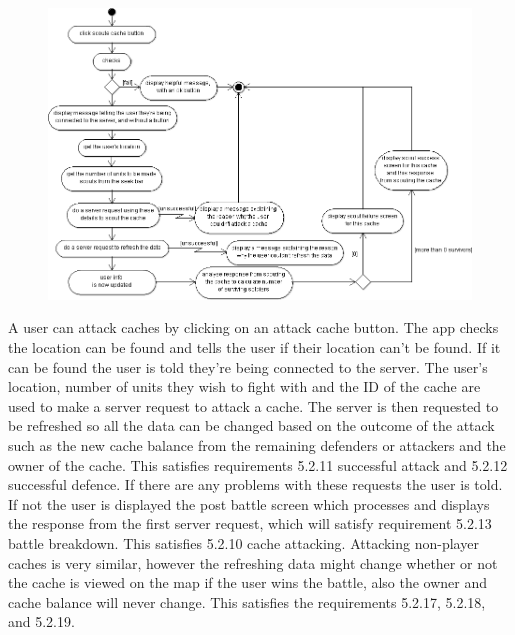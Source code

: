 \newpage
\begin{figure}
    \centering
    \includegraphics[width=\textwidth]{images/activity/scout-cache}
\end{figure}

A user can attack caches by clicking on an attack cache button. The app checks the location can be found and tells the user if their location can't be found. If it can be found the user is told they're being connected to the server. The user's location, number of units they wish to fight with and the ID of the cache are used to make a server request to attack a cache. The server is then requested to be refreshed so all the data can be changed based on the outcome of the attack such as the new cache balance from the remaining defenders or attackers and the owner of the cache. This satisfies requirements 5.2.11 successful attack and 5.2.12 successful defence. If there are any problems with these requests the user is told. If not the user is displayed the post battle screen which processes and displays the response from the first server request, which will satisfy requirement 5.2.13 battle breakdown. This satisfies 5.2.10 cache attacking. Attacking non-player caches is very similar, however the refreshing data might change whether or not the cache is viewed on the map if the user wins the battle, also the owner and cache balance will never change. This satisfies the requirements 5.2.17, 5.2.18, and 5.2.19.

